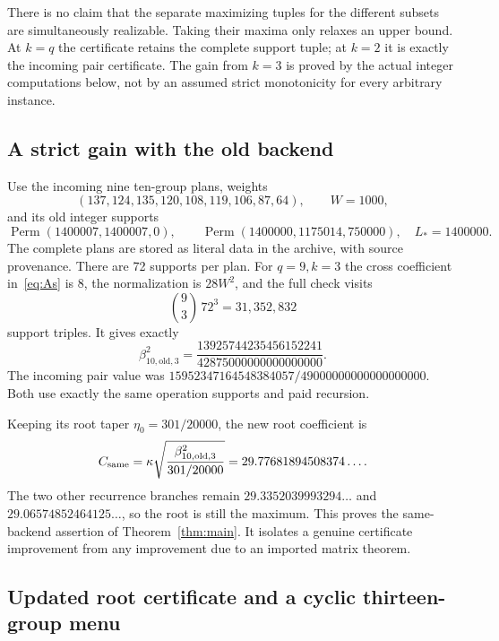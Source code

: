 There is no claim that the separate maximizing tuples for the different
subsets are simultaneously realizable. Taking their maxima only relaxes
an upper bound. At $k=q$ the certificate retains the complete support
tuple; at $k=2$ it is exactly the incoming pair certificate. The gain from
$k=3$ is proved by the actual integer computations below, not by an
assumed strict monotonicity for every arbitrary instance.

\subsection{A strict gain with the old backend}

Use the incoming nine ten-group plans, weights
\[
 (137,124,135,120,108,119,106,87,64),\qquad W=1000,
\]
and its old integer supports
\[
 \operatorname{Perm}(1400007,1400007,0),\qquad
 \operatorname{Perm}(1400000,1175014,750000),
 \quad L_*=1400000.
\]
The complete plans are stored as literal data in the archive, with
source provenance. There are 72 supports per plan. For $q=9,k=3$ the
cross coefficient in~\eqref{eq:As} is 8, the normalization is $28W^2$,
and the full check visits
\[
 \binom93\,72^3=31,352,832
\]
support triples. It gives exactly
\begin{equation}\label{eq:oldtriple}
 \beta_{10,\mathrm{old},3}^2
 =\frac{13925744235456152241}{42875000000000000000}.
\end{equation}
The incoming pair value was
$15952347164548384057/49000000000000000000$.
Both use exactly the same operation supports and paid recursion.

Keeping its root taper $\eta_0=301/20000$, the new root coefficient is
\[
 C_{\mathrm{same}}
 =\kappa\sqrt{\frac{\beta_{10,\mathrm{old},3}^2}{301/20000}}
 =29.77681894508374\ldots.
\]
The two other recurrence branches remain
$29.3352039993294\ldots$ and $29.06574852464125\ldots$, so the root
is still the maximum. This proves the same-backend assertion of
Theorem~\ref{thm:main}. It isolates a genuine certificate improvement
from any improvement due to an imported matrix theorem.

\subsection{Updated root certificate and a cyclic thirteen-group menu}


